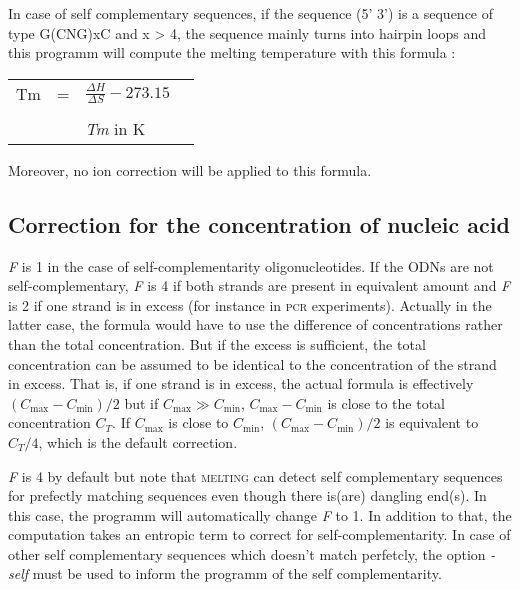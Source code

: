 \documentclass{article}
\begin{document}
In case of self complementary sequences, if the sequence (5' 3') is a sequence of type G(CNG)xC 
and x > 4, the sequence mainly turns into hairpin loops and this programm will compute the melting
temperature with this formula :


   
\begin{tabular}[h]{rcp{1.6in}p{2.2in}}
Tm & = & \begin{math} \frac{\Delta{}H}{\Delta{}S} - 273.15 \end{math} \\
   &   &                                                                                                                                                \\
   &   & \footnotesize \textit{Tm} in K 
\end{tabular}


Moreover, no ion correction will be applied to this formula.

\subsection{Correction for the concentration of nucleic acid }  

\textit{F} is 1 in the case of self-complementarity oligonucleotides. If the
ODNs are not self-complementary, \textit{F} is 4 if both strands are present in
equivalent amount and \textit{F} is 2 if one strand is in excess (for instance
in \textsc{pcr} experiments).  Actually in the latter case, the formula would
have to use the difference of concentrations rather than the total
concentration. But if the excess is sufficient, the total concentration can be
assumed to be identical to the concentration of the strand in excess. That is,
if one strand is in excess, the actual formula is effectively $(C_{\mbox{max}} -
C_{\mbox{min}})/2$ but if $C_{\mbox{max}} \gg C_{\mbox{min}}$, $C_{\mbox{max}}
- C_{\mbox{min}}$ is close to the total concentration $C_T$.  If $C_{\mbox{max}}$ is close
to $C_{\mbox{min}}$, $(C_{\mbox{max}} - C_{\mbox{min}})/2$ is equivalent to $C_T/4$, which is the default
correction.

\textit{F} is 4 by default but note that \textsc{melting} can detect self complementary sequences 
for prefectly matching sequences even though there is(are) dangling end(s). In this case, the programm will 
automatically change \textit{F} to 1. In addition to that, the computation takes an entropic term to correct 
for self-complementarity.
In case of other self complementary sequences which doesn't match perfetcly, the option \textit{-self} must be
used to inform the programm of the self complementarity.
  
\end{document}
